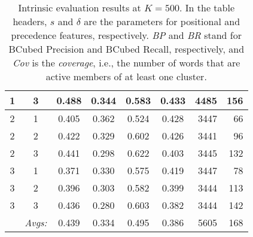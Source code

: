 \begin{enumerate}
{{\begin{table}
{\begin{tabular}{cc|ccccrr}
1 & 3 & 0.488 & 0.344 & 0.583 & 0.433 & 4485 & 156 \\ \hline %
2 & 1 & 0.405 & 0.362 & 0.524 & 0.428 & 3447 & 66 \\%
2 & 2 & 0.422 & 0.329 & 0.602 & 0.426 & 3441 & 96 \\%
2 & 3 & 0.441 & 0.298 & 0.622 & 0.403 & 3445 & 132 \\ \hline %
3 & 1 & 0.371 & 0.330 & 0.575 & 0.419 & 3447 & 78 \\%
3 & 2 & 0.396 & 0.303 & 0.582 & 0.399 & 3444 & 113 \\%
3 & 3 & 0.436 & 0.280 & 0.603 & 0.382 & 3444 & 142 \\ \hline \hline %
 & \textit{Avgs:}& 0.439 & 0.334 & 0.495 & 0.386 & 5605 & 168 \\
\end{tabular}
}
\caption{Intrinsic evaluation results at $K = 500$. In the table headers, $s$ and $\delta$ are the parameters for positional and precedence features, respectively. \textit{BP} and \textit{BR} stand for BCubed Precision and BCubed Recall, respectively, and \textit{Cov} is the \textit{coverage}, i.e., the number of words that are active members of at least one cluster.}
\label{tab:intr-500}
\end{table}


}}
\end{enumerate}
